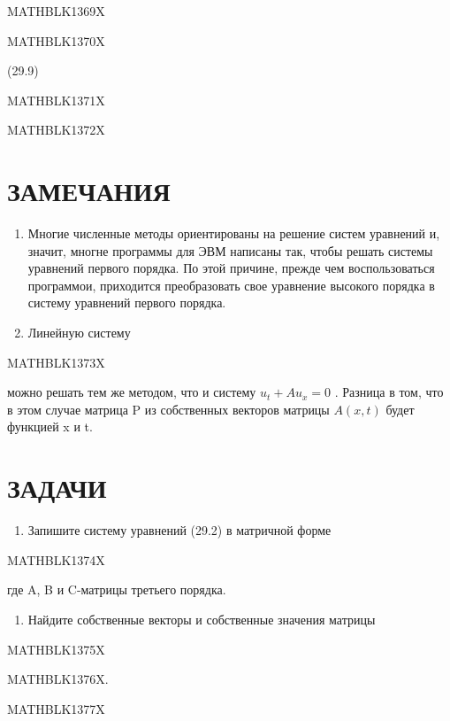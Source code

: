 \documentclass[
]{article}
\providecommand{\tightlist}{%
  \setlength{\itemsep}{0pt}\setlength{\parskip}{0pt}}
\begin{document}
MATHBLK1369X

MATHBLK1370X

(29.9)

MATHBLK1371X

MATHBLK1372X

\section{ЗАМЕЧАНИЯ}\label{ux437ux430ux43cux435ux447ux430ux43dux438ux44f-10}

\begin{enumerate}
\def\labelenumi{\arabic{enumi}.}
\item
  Многие численные методы ориентированы на решение систем уравнений и,
  значит, многне программы для ЭВМ написаны так, чтобы решать системы
  уравнений первого порядка. По этой причине, прежде чем воспользоваться
  программои, приходится преобразовать свое уравнение высокого порядка в
  систему уравнений первого порядка.
\item
  Линейную систему
\end{enumerate}

MATHBLK1373X

можно решать тем же методом, что и систему \(u_t + Au_x = 0\) . Разница
в том, что в этом случае матрица P из собственных векторов матрицы
\(A(x, t)\) будет функцией x и t.

\section{ЗАДАЧИ}\label{ux437ux430ux434ux430ux447ux438-10}

\begin{enumerate}
\def\labelenumi{\arabic{enumi}.}
\tightlist
\item
  Запишите систему уравнений (29.2) в матричной форме
\end{enumerate}

MATHBLK1374X

где A, B и C-матрицы третьего порядка.

\begin{enumerate}
\def\labelenumi{\arabic{enumi}.}
\setcounter{enumi}{1}
\tightlist
\item
  Найдите собственные векторы и собственные значения матрицы
\end{enumerate}

MATHBLK1375X

MATHBLK1376X.

MATHBLK1377X
\end{document}
